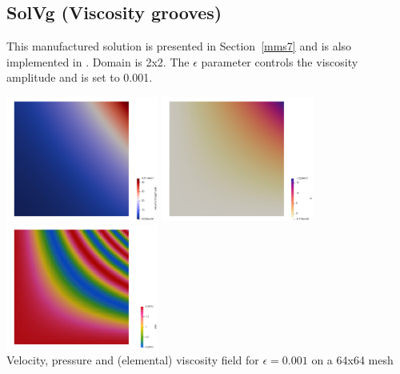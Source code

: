 \newpage
\subsection*{SolVg (Viscosity grooves)}

This manufactured solution is presented in Section~\ref{mms7} and is also implemented in \aspect.
Domain is 2x2. The $\epsilon$ parameter controls the viscosity amplitude and is set to 0.001.

\begin{center}
\includegraphics[width=5cm]{python_codes/fieldstone_112/results/exp6/vel}
\includegraphics[width=5cm]{python_codes/fieldstone_112/results/exp6/press}
\includegraphics[width=5cm]{python_codes/fieldstone_112/results/exp6/eta}\\
{\captionfont Velocity, pressure and (elemental) viscosity field for $\epsilon=0.001$ on a 64x64 mesh}
\end{center}


